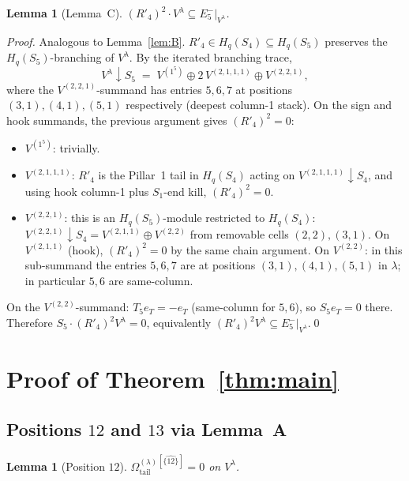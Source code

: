\documentclass[11pt]{article}
\newtheorem{lemma}[theorem]{Lemma}
\theoremstyle{definition}
\newcommand{\Hq}{H_q}
\newcommand{\Vlam}{V^\lambda}
\newcommand{\Omtail}{\Omega^{(\lambda)}_{\mathrm{tail}}}
\newcommand{\Rp}{R'}
\newcommand{\Eminus}[1]{E^-_{#1}}
\begin{document}
\begin{lemma}[Lemma~C]\label{lem:C}
$(\Rp_4)^2 \cdot \Vlam \subseteq \Eminus 5|_{\Vlam}$.
\end{lemma}

\begin{proof}
Analogous to Lemma~\ref{lem:B}. $\Rp_4 \in \Hq(S_4) \subseteq \Hq(S_5)$ preserves the
$\Hq(S_5)$-branching of $\Vlam$. By the iterated branching trace,
\[
   \Vlam \downarrow S_5 \;=\; V^{(1^5)} \oplus 2\, V^{(2,1,1,1)} \oplus V^{(2,2,1)},
\]
where the $V^{(2,2,1)}$-summand has entries $5, 6, 7$ at positions $(3,1), (4,1), (5,1)$
respectively (deepest column-1 stack). On the sign and hook summands, the previous
argument gives $(\Rp_4)^2 = 0$:
\begin{itemize}[topsep=0.2em,itemsep=0.1em]
\item $V^{(1^5)}$: trivially.
\item $V^{(2,1,1,1)}$: $\Rp_4$ is the Pillar~1 tail in $\Hq(S_4)$ acting on
   $V^{(2,1,1,1)} \downarrow S_4$, and using hook column-1 plus $S_1$-end kill,
   $(\Rp_4)^2 = 0$.
\item $V^{(2,2,1)}$: this is an $\Hq(S_5)$-module restricted to $\Hq(S_4)$:
   $V^{(2,2,1)} \downarrow S_4 = V^{(2,1,1)} \oplus V^{(2,2)}$ from removable cells
   $(2,2), (3,1)$. On $V^{(2,1,1)}$ (hook), $(\Rp_4)^2 = 0$ by the same chain
   argument. On $V^{(2,2)}$: in this sub-summand the entries $5, 6, 7$ are at
   positions $(3,1), (4,1), (5,1)$ in $\lambda$; in particular $5, 6$ are
   same-column.
\end{itemize}
On the $V^{(2,2)}$-summand: $T_5 e_T = -e_T$ (same-column for $5, 6$), so
$S_5 e_T = 0$ there. Therefore $S_5 \cdot (\Rp_4)^2 \Vlam = 0$, equivalently
$(\Rp_4)^2 \Vlam \subseteq \Eminus 5|_{\Vlam}$.\qed
\end{proof}

\section{Proof of Theorem~\ref{thm:main}}

\subsection{Positions $12$ and $13$ via Lemma~A}

\begin{lemma}[Position $12$]\label{lem:pos12}
$\Omtail^{[\widehat{\{12\}}]} = 0$ on $\Vlam$.
\end{lemma}
\end{document}
